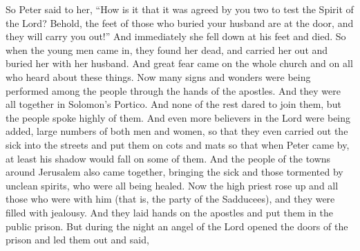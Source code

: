 \begin{biblechapter}
\verse So Peter said to her, “How is it that it was agreed by you two to test the Spirit of the Lord? Behold, the feet of those who buried your husband are at the door, and they will carry you out!”
\verse And immediately she fell down at his feet and died. So when the young men came in, they found her dead, and carried her out and buried her with her husband.
\verse And great fear came on the whole church and on all who heard about these things.
 Now many signs and wonders were being performed among the people through the hands of the apostles. And they were all together in Solomon’s Portico.
\verse And none of the rest dared to join them, but the people spoke highly of them.
\verse And even more believers in the Lord were being added, large numbers of both men and women,
\verse so that they even carried out the sick into the streets and put them on cots and mats so that when Peter came by, at least his shadow would fall on some of them.
\verse And the people of the towns around Jerusalem also came together, bringing the sick and those tormented by unclean spirits, who were all being healed.
 Now the high priest rose up and all those who were with him (that is, the party of the Sadducees), and they were filled with jealousy.
\verse And they laid hands on the apostles and put them in the public prison.
\verse But during the night an angel of the Lord opened the doors of the prison and led them out and said,

\end{biblechapter}
